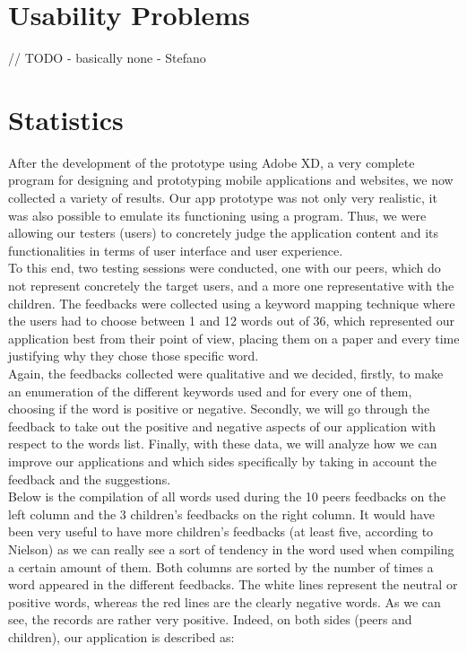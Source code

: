 \documentclass[12pt]{scrartcl}
\begin{document}
\section{Usability Problems}

	
	// TODO - basically none - Stefano
	
	
\section{Statistics}


	After the development of the prototype using Adobe XD, a very complete program for designing and prototyping mobile applications and websites, we now collected a variety of results. Our app prototype was not only very realistic, it was also possible to emulate its functioning using a program. Thus, we were allowing our testers (users) to concretely judge the application content and its functionalities in terms of user interface and user experience. \\

	To this end, two testing sessions were conducted, one with our peers, which do not represent concretely the target users, and a more one representative with the children. The feedbacks were collected using a keyword mapping technique where the users had to choose between 1 and 12 words out of 36, which represented our application best from their point of view, placing them on a paper and every time justifying why they chose those specific word.\\

	Again, the feedbacks collected were qualitative and we decided, firstly, to make an enumeration of the different keywords used and for every one of them, choosing if the word is positive or negative. Secondly, we will go through the feedback to take out the positive and negative aspects of our application with respect to the words list. Finally, with these data, we will analyze how we can improve our applications and which sides specifically by taking in account the feedback and the suggestions.\\

	Below is the compilation of all words used during the 10 peers feedbacks on the left column and the 3 children’s feedbacks on the right column. It would have been very useful to have more children’s feedbacks (at least five, according to Nielson) as we can really see a sort of tendency in the word used when compiling a certain amount of them. Both columns are sorted by the number of times a word appeared in the different feedbacks. The white lines represent the neutral or positive words, whereas the red lines are the clearly negative words. As we can see, the records are rather very positive. Indeed, on both sides (peers and children), our application is described as:\\
	
\end{document}
